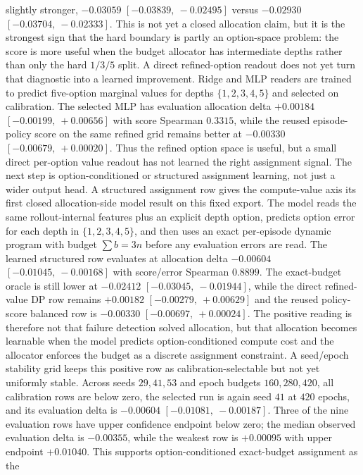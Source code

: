 slightly stronger, $-0.03059$ $[-0.03839,\ -0.02495]$ versus $-0.02930$
$[-0.03704,\ -0.02333]$.  This is not yet a closed allocation claim, but it is
the strongest sign that the hard boundary is partly an option-space problem:
the score is more useful when the budget allocator has intermediate depths
rather than only the hard $1/3/5$ split.
A direct refined-option readout does not yet turn that diagnostic into a
learned improvement.  Ridge and MLP readers are trained to predict
five-option marginal values for depths $\{1,2,3,4,5\}$ and selected on
calibration.  The selected MLP has evaluation allocation delta $+0.00184$
$[-0.00199,\ +0.00656]$ with score Spearman $0.3315$, while the reused
episode-policy score on the same refined grid remains better at $-0.00330$
$[-0.00679,\ +0.00020]$.  Thus the refined option space is useful, but a
small direct per-option value readout has not learned the right assignment
signal.  The next step is option-conditioned or structured assignment learning,
not just a wider output head.
A structured assignment row gives the compute-value axis its first closed
allocation-side model result on this fixed export.  The model reads the same
rollout-internal features plus an explicit depth option, predicts option error
for each depth in $\{1,2,3,4,5\}$, and then uses an exact per-episode dynamic
program with budget $\sum b = 3n$ before any evaluation errors are read.  The
learned structured row evaluates at allocation delta $-0.00604$
$[-0.01045,\ -0.00168]$ with score/error Spearman $0.8899$.  The exact-budget
oracle is still lower at $-0.02412$ $[-0.03045,\ -0.01944]$, while the direct
refined-value DP row remains $+0.00182$ $[-0.00279,\ +0.00629]$ and the reused
policy-score balanced row is $-0.00330$ $[-0.00697,\ +0.00024]$.  The positive
reading is therefore not that failure detection solved allocation, but that
allocation becomes learnable when the model predicts option-conditioned
compute cost and the allocator enforces the budget as a discrete assignment
constraint.
A seed/epoch stability grid keeps this positive row as calibration-selectable
but not yet uniformly stable.  Across seeds $29,41,53$ and epoch budgets
$160,280,420$, all calibration rows are below zero, the selected run is again
seed $41$ at $420$ epochs, and its evaluation delta is $-0.00604$
$[-0.01081,\ -0.00187]$.  Three of the nine evaluation rows have upper
confidence endpoint below zero; the median observed evaluation delta is
$-0.00355$, while the weakest row is $+0.00095$ with upper endpoint
$+0.01040$.  This supports option-conditioned exact-budget assignment as the
